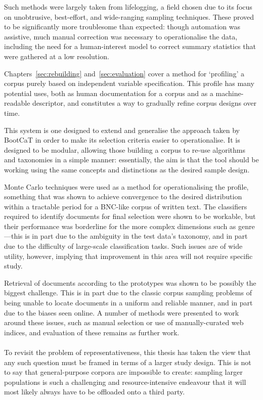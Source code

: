 Such methods were largely taken from lifelogging, a field chosen due to its focus on unobtrusive, best-effort, and wide-ranging sampling techniques.  These proved to be significantly more troublesome than expected: though automation was assistive, much manual correction was necessary to operationalise the data, including the need for a human-interest model to correct summary statistics that were gathered at a low resolution.


Chapters~\ref{sec:rebuilding} and~\ref{sec:evaluation} cover a method for `profiling' a corpus purely based on independent variable specification.  This profile has many potential uses, both as human documentation for a corpus and as a machine-readable descriptor, and constitutes a way to gradually refine corpus designs over time.

This system is one designed to extend and generalise the approach taken by BootCaT in order to make its selection criteria easier to operationalise.  It is designed to be modular, allowing those building a corpus to re-use algorithms and taxonomies in a simple manner: essentially, the aim is that the tool should be working using the same concepts and distinctions as the desired sample design.

Monte Carlo techniques were used as a method for operationalising the profile, something that was shown to achieve convergence to the desired distribution within a tractable period for a BNC-like corpus of written text.  The classifiers required to identify documents for final selection were shown to be workable, but their performance was borderline for the more complex dimensions such as genre---this is in part due to the ambiguity in the test data's taxonomy, and in part due to the difficulty of large-scale classification tasks.  Such issues are of wide utility, however, implying that improvement in this area will not require specific study.

Retrieval of documents according to the prototypes was shown to be possibly the biggest challenge.  This is in part due to the classic corpus sampling problems of being unable to locate documents in a uniform and reliable manner, and in part due to the biases seen online.  A number of methods were presented to work around these issues, such as manual selection or use of manually-curated web indices, and evaluation of these remains as further work.




\paragraph{}
To revisit the problem of representativeness, this thesis has taken the view that any such question must be framed in terms of a larger study design.  This is not to say that general-purpose corpora are impossible to create: sampling larger populations is such a challenging and resource-intensive endeavour that it will most likely always have to be offloaded onto a third party.


